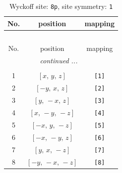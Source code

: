 \documentclass[fleqn,8pt]{jsarticle}
\begin{document}
\renewcommand{\arraystretch}{1.2}
\begin{longtable}{ccc}
\caption{Wyckoff site: {\tt 8p}, site symmetry: {\tt 1}}
 \\
 \hline \hline
No. & position & mapping \\ \hline \endfirsthead

\multicolumn{2}{l}{\tablename\ \thetable{}} \\
 \hline \hline
No. & position & mapping \\ \hline \endhead

 \hline \hline
\multicolumn{2}{r}{\footnotesize\it continued ...} \\ \endfoot

 \hline \hline
\multicolumn{2}{r}{} \\ \endlastfoot

1 & $\left[ x,\, y,\, z \right]$ & {\tt [1]} \\ \hline
2 & $\left[ - y,\, x,\, z \right]$ & {\tt [2]} \\ \hline
3 & $\left[ y,\, - x,\, z \right]$ & {\tt [3]} \\ \hline
4 & $\left[ x,\, - y,\, - z \right]$ & {\tt [4]} \\ \hline
5 & $\left[ - x,\, y,\, - z \right]$ & {\tt [5]} \\ \hline
6 & $\left[ - x,\, - y,\, z \right]$ & {\tt [6]} \\ \hline
7 & $\left[ y,\, x,\, - z \right]$ & {\tt [7]} \\ \hline
8 & $\left[ - y,\, - x,\, - z \right]$ & {\tt [8]} \\
\end{longtable}
\end{document}
